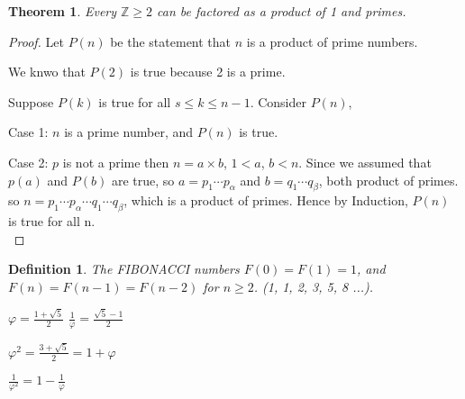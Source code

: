 \documentclass[12pt]{article}
\theoremstyle{plain}
\newtheorem{theorem}{Theorem}[subsection]
\newtheorem{definition}{Definition}[subsection]
\renewcommand{\phi}{\varphi}
\begin{document}
        \begin{theorem}
            Every $\mathbb{Z}\geq 2$ can be factored
            as a product of 1 and primes.
        \end{theorem}
        \begin{proof}
            Let $P(n)$ be the statement that $n$ is a product of prime numbers.
            
            We knwo that $P(2)$ is true because 2 is a prime.

            Suppose $P(k)$ is true for all $s\leq k\leq n-1$. 
            Consider $P(n)$,

            \setlength\parindent{12pt} Case 1: $n$ is a prime number, 
                and $P(n)$ is true. 

            \setlength\parindent{12pt} Case 2: $p$ is not a prime
                then $n = a\times b$, $1 < a$, $b<n$. 
                Since we assumed that $p(a)$ and $P(b)$ are true,
                so $a = p_1 \cdots p_\alpha$ and $b = q_1 \cdots q_\beta$,
                both product of primes. 
                so $n = p_1 \cdots p_\alpha \cdots q_1 \cdots q_\beta$,
                which is a product of primes.
                Hence by Induction, $P(n)$ is true for all n.\\
        \end{proof}

        \begin{definition}
            The FIBONACCI numbers $F(0) = F(1) = 1$, 
            and $F(n) = F(n-1) = F(n-2)$ for $n\geq 2$. 
            (1, 1, 2, 3, 5, 8 ...).

           $\phi = \frac{1+\sqrt 5}2$      \qquad  \qquad
           $\frac 1 {\phi} = \frac{\sqrt 5-1}2$ 

           $\phi ^ 2= \frac{3+\sqrt 5}2= 1+\phi$ \qquad 
           
           $\frac1 {\phi ^2} = 1 -\frac1 {\phi}$ \\
        \end{definition}
\end{document}
